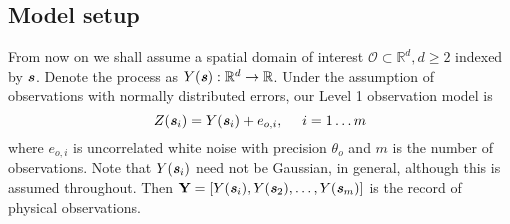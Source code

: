 \documentclass[10pt,a4paper]{article}
\newcommand{\thetab} {{\boldsymbol{\theta}}}
\newcommand{\varthetab} {{\boldsymbol{\vartheta}}}
\newcommand{\Yvec} {\textbf{Y}}
\newcommand{\svec} {\textbf{\textit{s}}}
\begin{document}
\subsection{Model setup}

From now on we shall assume a spatial domain of interest $\mathcal{O} \subset \mathbb{R}^d, d \ge 2$ indexed by $\svec$. Denote the process as  $Y(\svec): \mathbb{R}^d \rightarrow \mathbb{R}$. Under the assumption of observations with normally distributed errors, our Level 1 observation model is 
\begin{equation}
Z(\svec_i) = Y(\svec_i) + e_{o,i}, ~~~~ i = 1\dots m
\end{equation}
\noindent where $e_{o,i}$ is uncorrelated white noise with precision $\theta_o$ and $m$ is the number of observations. Note that $Y(\svec_i)$ need not be Gaussian, in general, although this is assumed throughout. Then $\Yvec = [Y(\svec_i), Y(\svec_2), \dots, Y(\svec_m)]$ is the record of physical observations. 

%
\end{document}
